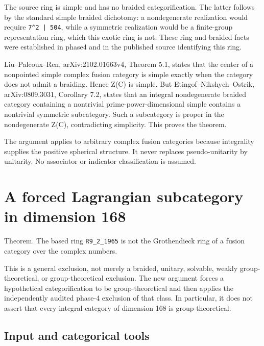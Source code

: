 The source ring is simple and has no braided categorification. The
latter follows by the standard simple braided dichotomy: a nondegenerate
realization would require
\texttt{7\textasciicircum{}2 | \allowbreak{}504}, while a symmetric
realization would be a finite-group representation ring, which this
exotic ring is not. These ring and braided facts were established in
phase4 and in the published source identifying this ring.

Liu--Palcoux--Ren, arXiv:2102.01663v4, Theorem 5.1, states that the
center of a nonpointed simple complex fusion category is simple exactly
when the category does not admit a braiding. Hence Z(C) is simple. But
Etingof--Nikshych--Ostrik, arXiv:0809.3031, Corollary 7.2, states that
an integral nondegenerate braided category containing a nontrivial
prime-power-dimensional simple contains a nontrivial symmetric
subcategory. Such a subcategory is proper in the nondegenerate Z(C),
contradicting simplicity. This proves the theorem.

The argument applies to arbitrary complex fusion categories because
integrality supplies the positive spherical structure. It never replaces
pseudo-unitarity by unitarity. No associator or indicator classification
is assumed.

\hypertarget{a-forced-lagrangian-subcategory-in-dimension-168}{%
\section{A forced Lagrangian subcategory in dimension
168}\label{a-forced-lagrangian-subcategory-in-dimension-168}}

Theorem. The based ring \texttt{R9\_\allowbreak{}2\_\allowbreak{}1965}
is not the Grothendieck ring of a fusion category over the complex
numbers.

This is a general exclusion, not merely a braided, unitary, solvable,
weakly group-theoretical, or group-theoretical exclusion. The new
argument forces a hypothetical categorification to be group-theoretical
and then applies the independently audited phase-4 exclusion of that
class. In particular, it does not assert that every integral category of
dimension 168 is group-theoretical.

\hypertarget{input-and-categorical-tools}{%
\subsection{Input and categorical
tools}\label{input-and-categorical-tools}}

